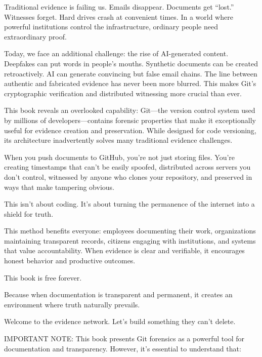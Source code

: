 Traditional evidence is failing us. Emails disappear. Documents get
``lost.'' Witnesses forget. Hard drives crash at convenient times. In a
world where powerful institutions control the infrastructure, ordinary
people need extraordinary proof.

Today, we face an additional challenge: the rise of AI-generated
content. Deepfakes can put words in people's mouths. Synthetic documents
can be created retroactively. AI can generate convincing but false email
chains. The line between authentic and fabricated evidence has never
been more blurred. This makes Git's cryptographic verification and
distributed witnessing more crucial than ever.

This book reveals an overlooked capability: Git---the version control
system used by millions of developers---contains forensic properties
that make it exceptionally useful for evidence creation and
preservation. While designed for code versioning, its architecture
inadvertently solves many traditional evidence challenges.

When you push documents to GitHub, you're not just storing files. You're
creating timestamps that can't be easily spoofed, distributed across
servers you don't control, witnessed by anyone who clones your
repository, and preserved in ways that make tampering obvious.

This isn't about coding. It's about turning the permanence of the
internet into a shield for truth.

This method benefits everyone: employees documenting their work,
organizations maintaining transparent records, citizens engaging with
institutions, and systems that value accountability. When evidence is
clear and verifiable, it encourages honest behavior and productive
outcomes.

This book is free forever.

Because when documentation is transparent and permanent, it creates an
environment where truth naturally prevails.

Welcome to the evidence network. Let's build something they can't
delete.

IMPORTANT NOTE: This book presents Git forensics as a powerful tool for
documentation and transparency. However, it's essential to understand
that:

